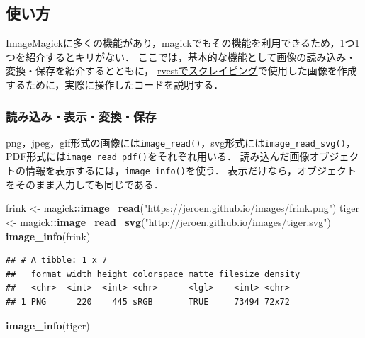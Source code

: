\documentclass[
]{article}
\newenvironment{Shaded}{\begin{snugshade}}{\end{snugshade}}
\newcommand{\FunctionTok}[1]{\textcolor[rgb]{0.13,0.29,0.53}{\textbf{#1}}}
\newcommand{\NormalTok}[1]{#1}
\newcommand{\OtherTok}[1]{\textcolor[rgb]{0.56,0.35,0.01}{#1}}
\newcommand{\SpecialCharTok}[1]{\textcolor[rgb]{0.81,0.36,0.00}{\textbf{#1}}}
\newcommand{\StringTok}[1]{\textcolor[rgb]{0.31,0.60,0.02}{#1}}
\begin{document}
\hypertarget{ux4f7fux3044ux65b9-1}{%
\subsection{使い方}\label{ux4f7fux3044ux65b9-1}}

ImageMagickに多くの機能があり，magickでもその機能を利用できるため，1つ1つを紹介するとキリがない．
ここでは，基本的な機能として画像の読み込み・変換・保存を紹介するとともに，
\protect\hyperlink{rvest}{rvestでスクレイピング}で使用した画像を作成するために，実際に操作したコードを説明する．

\hypertarget{ux8aadux307fux8fbcux307fux8868ux793aux5909ux63dbux4fddux5b58}{%
\subsubsection{読み込み・表示・変換・保存}\label{ux8aadux307fux8fbcux307fux8868ux793aux5909ux63dbux4fddux5b58}}

png，jpeg，gif形式の画像には\texttt{image\_read()}，svg形式には\texttt{image\_read\_svg()}，PDF形式には\texttt{image\_read\_pdf()}をそれぞれ用いる．
読み込んだ画像オブジェクトの情報を表示するには，\texttt{image\_info()}を使う．
表示だけなら，オブジェクトをそのまま入力しても同じである．

\begin{Shaded}
\begin{Highlighting}[]
\NormalTok{frink }\OtherTok{\textless{}{-}}\NormalTok{ magick}\SpecialCharTok{::}\FunctionTok{image\_read}\NormalTok{(}\StringTok{"https://jeroen.github.io/images/frink.png"}\NormalTok{)}
\NormalTok{tiger }\OtherTok{\textless{}{-}}\NormalTok{ magick}\SpecialCharTok{::}\FunctionTok{image\_read\_svg}\NormalTok{(}\StringTok{"http://jeroen.github.io/images/tiger.svg"}\NormalTok{)}
\FunctionTok{image\_info}\NormalTok{(frink)}
\end{Highlighting}
\end{Shaded}

\begin{verbatim}
## # A tibble: 1 x 7
##   format width height colorspace matte filesize density
##   <chr>  <int>  <int> <chr>      <lgl>    <int> <chr>  
## 1 PNG      220    445 sRGB       TRUE     73494 72x72
\end{verbatim}

\begin{Shaded}
\begin{Highlighting}[]
\FunctionTok{image\_info}\NormalTok{(tiger)}
\end{Highlighting}
\end{Shaded}
\end{document}
